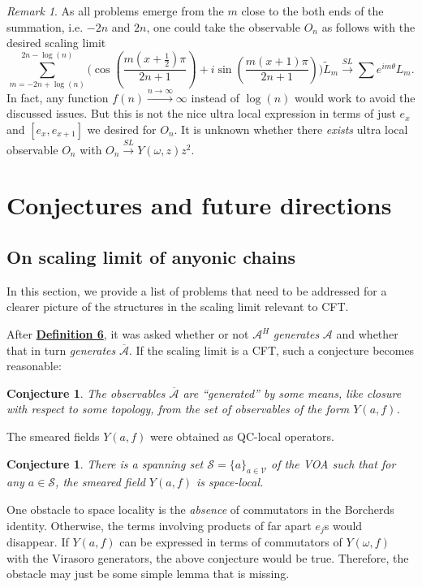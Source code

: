 \documentclass[twoside,11pt,titlepage]{amsart}
\renewcommand{\=}[1]{\stackrel{#1}{=}} %
\newtheorem{cnj}[thm]{Conjecture}
\theoremstyle{definition}
\theoremstyle{remark}
\newtheorem{rmk}{Remark}
\begin{document}
\begin{rmk}\label{rmk13}
As all problems emerge from the $m$ close to the both ends of the summation, i.e. $-2n$ and $2n$, one could take the observable $O_n$ as follows with the desired scaling limit
$$\sum_{m=-2n+\log(n)}^{2n-\log(n)}\Big(\cos(\frac{m(x+\frac{1}{2})\pi}{2n+1})+i\sin(\frac{m(x+1)\pi}{2n+1})\Big)\widetilde{L}_m \xrightarrow{SL} \sum e^{im\theta}L_m.$$
In fact, any function $f(n) \xrightarrow{n \to \infty} \infty$ instead of $\log(n)$ would work to avoid the discussed issues. But this is not the nice ultra local expression in terms of just $e_x$ and $[e_x,e_{x+1}]$ we desired for $O_n$. It is unknown whether there \textit{exists} ultra local observable $O_n$ with $O_n \xrightarrow{SL} Y(\omega,z)z^2$.
\end{rmk}

\section{Conjectures and future directions}\label{5}

\subsection{On scaling limit of anyonic chains}\label{5.1}

\hfill \break
In this section, we provide a list of problems that need to be addressed for a clearer picture of the structures in the scaling limit relevant to CFT.

After \hyperref[dfn6]{\textbf{Definition 6}}, it was asked whether or not $\mathcal{A}^H$ \textit{generates} $\mathcal{A}$ and whether that in turn \textit{generates} $\overline{\mathcal{A}}$. If the scaling limit is a CFT, such a conjecture becomes reasonable:
\begin{cnj}\label{cnj5.1}
The observables $\overline{\mathcal{A}}$ are ``generated'' by some means, like closure with respect to some topology, from the set of observables of the form $Y(a,f)$.
\end{cnj}

The smeared fields $Y(a,f)$ were obtained as QC-local operators.
\begin{cnj}\label{cnj5.2}
There is a spanning set $\mathcal{S}=\{a\}_{a \in \mathcal{V}}$ of the VOA such that for any $a \in \mathcal{S}$, the smeared field $Y(a,f)$ is space-local.
\end{cnj}

One obstacle to space locality is the \textit{absence} of commutators in the Borcherds identity. Otherwise, the terms involving products of far apart $e_j$s would disappear. If $Y(a,f)$ can be expressed in terms of commutators of $Y(\omega,f)$ with the Virasoro generators, the above conjecture would be true. Therefore, the obstacle may just be some simple lemma that is missing.
\end{document}
